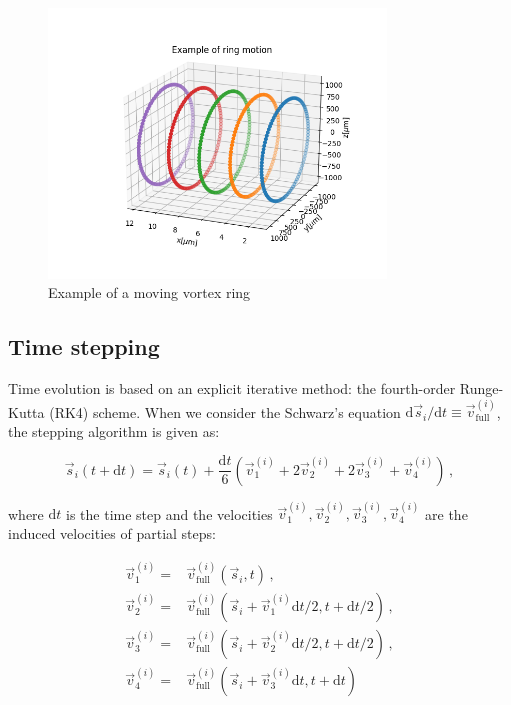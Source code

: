 \begin{figure}[h]
	\centering
	\includegraphics[width=0.8\textwidth]{graphics/simul/time-example}
	\caption{Example of a moving vortex ring}
	\label{motion}
\end{figure}

\subsection*{Time stepping}

Time evolution is based on an explicit iterative method: the fourth-order Runge-Kutta (RK4) scheme. When we consider the Schwarz's equation $\text{d}\vec{s}_i / \text{d}t \equiv \vec{v}_{\text{full}}^{(i)}$, the stepping algorithm is given as:

\begin{equation}
\vec{s}_{i}(t+\text{d}t) =
\vec{s}_{i}(t) +
\frac{\text{d}t}{6} (\vec{v}_1^{(i)} + 2\vec{v}_2^{(i)} + 2\vec{v}_3^{(i)} + \vec{v}_4^{(i)})\,,
\end{equation}

where $\text{d}t$ is the time step and the velocities $\vec{v}_1^{(i)}, \vec{v}_2^{(i)}, \vec{v}_3^{(i)}, \vec{v}_4^{(i)}$ are the induced velocities of partial steps:

\begin{align}
\vec{v}_1^{(i)} =& \vec{v}_{\text{full}}^{(i)}
(\vec{s}_i, t)\,,
\\
\vec{v}_2^{(i)} =& \vec{v}_{\text{full}}^{(i)}
(\vec{s}_i + \vec{v}_1^{(i)} \text{d}t / 2, t + \text{d}t / 2)\,,
\\
\vec{v}_3^{(i)} =& \vec{v}_{\text{full}}^{(i)}
(\vec{s}_i + \vec{v}_2^{(i)} \text{d}t / 2, t + \text{d}t / 2)\,,
\\
\vec{v}_4^{(i)} =& \vec{v}_{\text{full}}^{(i)}
(\vec{s}_i + \vec{v}_3^{(i)} \text{d}t, t + \text{d}t)
\end{align}

